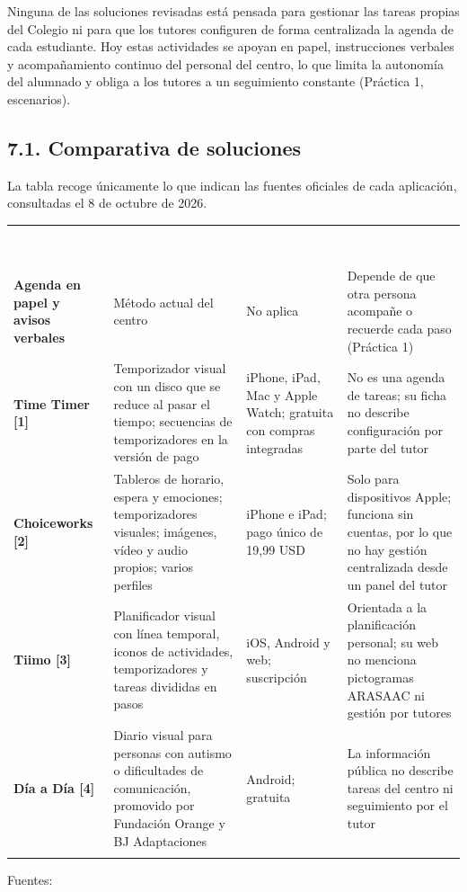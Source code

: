 \documentclass[11pt,a4paper]{article}
\newcommand{\hl}[1]{\textcolor{gblue}{\textbf{#1}}}
\begin{document}
Ninguna de las soluciones revisadas está pensada para gestionar las tareas propias del Colegio ni para que los tutores configuren de forma centralizada la agenda de cada estudiante. Hoy estas actividades se apoyan en papel, instrucciones verbales y acompañamiento continuo del personal del centro, lo que limita la autonomía del alumnado y obliga a los tutores a un seguimiento constante (Práctica 1, escenarios).

\subsection*{7.1. Comparativa de soluciones}
La tabla recoge únicamente lo que indican las fuentes oficiales de cada aplicación, consultadas el 8 de octubre de 2026.

\par\noindent\begin{tabular}{@{}>{\raggedright\arraybackslash}p{}>{\raggedright\arraybackslash}p{}>{\raggedright\arraybackslash}p{}>{\raggedright\arraybackslash}p{}@{}}
\rowcolor{gblue}\textcolor{white}{\textbf{Solución}} & \textcolor{white}{\textbf{Qué ofrece}} & \textcolor{white}{\textbf{Plataforma y coste}} & \textcolor{white}{\textbf{Qué no cubre para el Colegio}} \\
\hl{Agenda en papel y avisos verbales} & Método actual del centro & No aplica & Depende de que otra persona acompañe o recuerde cada paso (Práctica 1) \\ \arrayrulecolor{gline}\hline
\rowcolor{glight}
\hl{Time Timer [1]} & Temporizador visual con un disco que se reduce al pasar el tiempo; secuencias de temporizadores en la versión de pago & iPhone, iPad, Mac y Apple Watch; gratuita con compras integradas & No es una agenda de tareas; su ficha no describe configuración por parte del tutor \\ \arrayrulecolor{gline}\hline
\hl{Choiceworks [2]} & Tableros de horario, espera y emociones; temporizadores visuales; imágenes, vídeo y audio propios; varios perfiles & iPhone e iPad; pago único de 19,99 USD & Solo para dispositivos Apple; funciona sin cuentas, por lo que no hay gestión centralizada desde un panel del tutor \\ \arrayrulecolor{gline}\hline
\rowcolor{glight}
\hl{Tiimo [3]} & Planificador visual con línea temporal, iconos de actividades, temporizadores y tareas divididas en pasos & iOS, Android y web; suscripción & Orientada a la planificación personal; su web no menciona pictogramas ARASAAC ni gestión por tutores \\ \arrayrulecolor{gline}\hline
\hl{Día a Día [4]} & Diario visual para personas con autismo o dificultades de comunicación, promovido por Fundación Orange y BJ Adaptaciones & Android; gratuita & La información pública no describe tareas del centro ni seguimiento por el tutor \\ \arrayrulecolor{gline}\hline
\end{tabular}\par\medskip
Fuentes:
\end{document}
